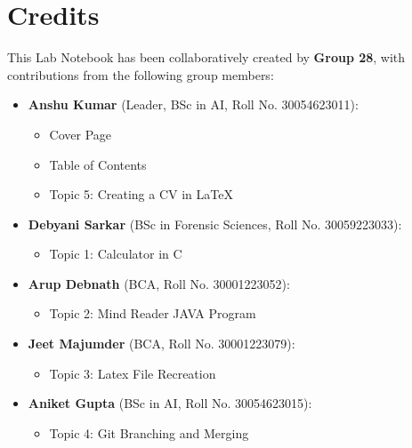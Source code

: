 \section*{Credits}

This Lab Notebook has been collaboratively created by \textbf{Group 28}, with contributions from the following group members:

\begin{itemize}
    \item \textbf{Anshu Kumar} (Leader, BSc in AI, Roll No. 30054623011):
    \begin{itemize}
        \item Cover Page
        \item Table of Contents
        \item Topic 5: Creating a CV in LaTeX
    \end{itemize}
    
    \item \textbf{Debyani Sarkar} (BSc in Forensic Sciences, Roll No. 30059223033):
    \begin{itemize}
        \item Topic 1: Calculator in C
    \end{itemize}
    
    \item \textbf{Arup Debnath} (BCA, Roll No. 30001223052):
    \begin{itemize}
        \item Topic 2: Mind Reader JAVA Program
    \end{itemize}
    
    \item \textbf{Jeet Majumder} (BCA, Roll No. 30001223079):
    \begin{itemize}
        \item Topic 3: Latex File Recreation
    \end{itemize}
    
    \item \textbf{Aniket Gupta} (BSc in AI, Roll No. 30054623015):
    \begin{itemize}
        \item Topic 4: Git Branching and Merging
    \end{itemize}
    
\end{itemize}